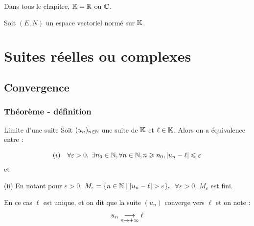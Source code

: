 
Dans tous le chapitre, $\mathbb{K} = \mathbb{R}$ ou $\mathbb{C}$.

Soit $(E, N)$ un espace vectoriel normé sur $\mathbb{K}$.

\section{Suites réelles ou complexes}
\subsection{Convergence}
\subsubsection{Théorème - définition}   

\begin{definition}{Limite d'une suite}{}
    Soit $(u_n)_{n\in\mathbb{N}}$ une suite de $\mathbb{K}$ et $\ell \in \mathbb{K}$. Alors on a équivalence entre : 

    $$(i) \quad \forall \varepsilon > 0, \; \exists n_0 \in \mathbb{N}, \forall n \in \mathbb{N}, n \geqslant n_0, |u_n - \ell| \leqslant \varepsilon$$
    et 
    
    \quad (ii) En notant pour $\varepsilon > 0$, $M_\varepsilon = \{n \in \mathbb{N} \mid |u_n - \ell| > \varepsilon\},$ 
    $\; \forall \varepsilon > 0, \, M_\varepsilon$ est fini.

    En ce cas $\ell$ est unique, et on dit que la suite $(u_n)$ converge vers $\ell$ et on note  :
    $$ u_n \underset{n \to +\infty}{\longrightarrow} \ell$$ 
\end{definition}


